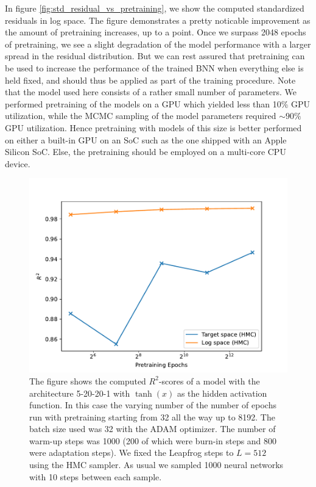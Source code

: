 In figure \ref{fig:std_residual_vs_pretraining}, we
show the computed standardized residuals in log space. The figure demonstrates a pretty noticable improvement as the amount of pretraining increases, up to a point. Once we surpass 2048 epochs of pretraining, we see a slight degradation of the model performance with a larger spread in the residual distribution. But we can rest assured that pretraining can be used to increase the performance of the trained BNN when everything else is held fixed, and should thus be applied as part of the training procedure. Note that the model used here consists of a rather small number of parameters. We performed pretraining of the models on a GPU which yielded less than 10\% GPU utilization, while the MCMC sampling of the model parameters required $\sim 90\%$ GPU utilization. Hence pretraining with models of this size is better performed on either a built-in GPU on an SoC such as the one shipped with an Apple Silicon SoC. Else, the pretraining should be employed on a multi-core CPU device.

\begin{figure}[h!]
    \centering
    \includegraphics[scale=0.7]{figures/r2_scores/r2_score_vs_pretraining.pdf}
    \caption{The figure shows the computed $R^2$-scores of a model with the architecture 5-20-20-1 with $\tanh(x)$ as the
    hidden activation function. In this case the varying number of the number of epochs run with pretraining starting from 32 all the way up to 8192. The batch size used was 32 with the ADAM optimizer. The number of warm-up steps was 1000 (200 of which were burn-in steps and 800 were adaptation steps). We fixed the Leapfrog steps to $L = 512$ using the HMC sampler. As usual we sampled 1000 neural networks with 10 steps between each sample.
    }
    \label{fig:r2_score_vs_pretraining}
\end{figure}


